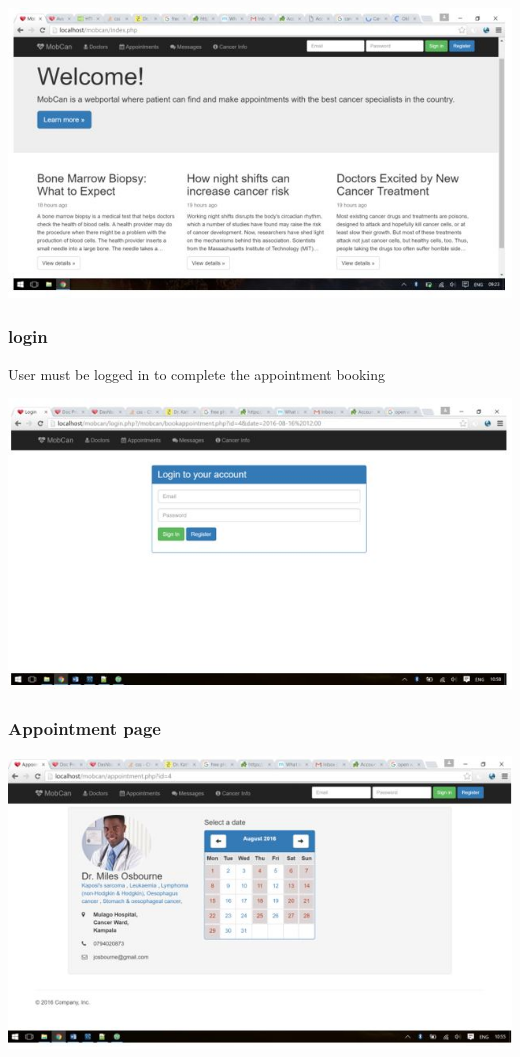\documentclass[12pt]{article}
\begin{document}
\begin{center}
\includegraphics[scale=1.2]{home}
\end{center}


\subsubsection{login}
User must be logged in to complete the appointment booking

\begin{center}
\includegraphics[scale=1.2]{login}
\end{center}

\subsubsection{Appointment page}


\begin{center}
\includegraphics[scale=1.2]{appointment}
\end{center}
\end{document}
